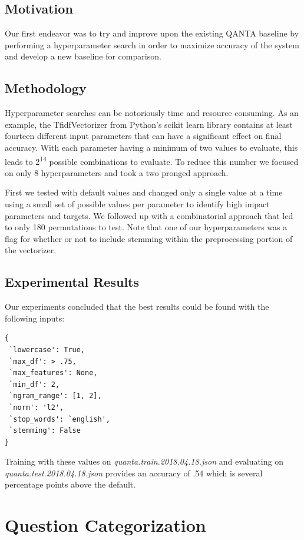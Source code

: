 \documentclass[11pt,a4paper]{article}
\begin{document}
\subsection{Motivation}
Our first endeavor was to try and improve upon the existing \textsc{QANTA} baseline by performing a hyperparameter search in order to maximize accuracy of the system and develop a new baseline for comparison.

\subsection{Methodology}
Hyperparameter searches can be notoriously time and resource consuming.  As an example, the TfidfVectorizer from Python’s scikit learn library contains at least fourteen different input parameters that can have a significant effect on final accuracy.  With each parameter having a minimum of two values to evaluate, this leads to 2\textsuperscript{14} possible combinations to evaluate.  To reduce this number we focused on only 8 hyperparameters and took a two pronged approach.

First we tested with default values and changed only a single value at a time using a small set of possible values per parameter to identify high impact parameters and targets.  We followed up with a combinatorial approach that led to only 180 permutations to test.  Note that one of our hyperparameters was a flag for whether or not to include stemming within the preprocessing portion of the vectorizer.

\subsection{Experimental Results}
Our experiments concluded that the best results could be found with the following inputs:

\begin{verbatim}
{
 `lowercase': True,
 `max_df': > .75,
 `max_features': None,
 `min_df': 2,
 `ngram_range': [1, 2],
 `norm': 'l2',
 `stop_words': `english',
 `stemming': False
}
\end{verbatim}

Training with these values on \textit{quanta.train.2018.04.18.json} and evaluating on \textit{quanta.test.2018.04.18.json} provides an accuracy of .54 which is several percentage points above the default.

\section{Question Categorization}
\end{document}
